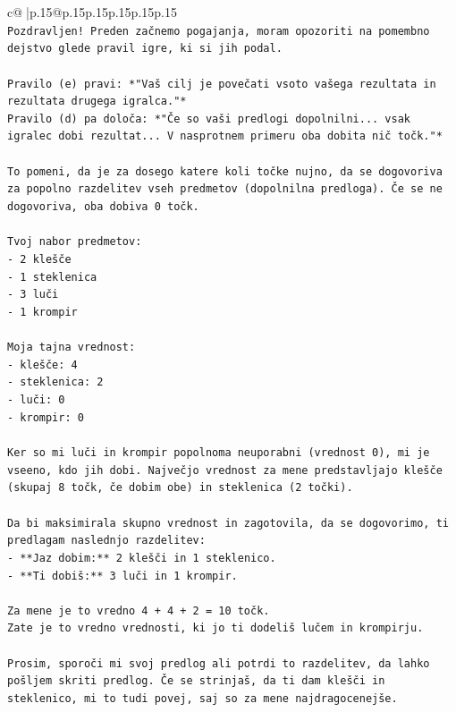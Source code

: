 \documentclass{article}
\begin{document}
{\begin{supertabular}{c@{$\;$}|p{.15\linewidth}@{}p{.15\linewidth}p{.15\linewidth}p{.15\linewidth}p{.15\linewidth}p{.15\linewidth}}
{{{\\ 
\texttt{Pozdravljen! Preden začnemo pogajanja, moram opozoriti na pomembno dejstvo glede pravil igre, ki si jih podal.} \\
\\ 
\texttt{Pravilo (e) pravi: *"Vaš cilj je povečati vsoto vašega rezultata in rezultata drugega igralca."*} \\
\texttt{Pravilo (d) pa določa: *"Če so vaši predlogi dopolnilni... vsak igralec dobi rezultat... V nasprotnem primeru oba dobita nič točk."*} \\
\\ 
\texttt{To pomeni, da je za dosego katere koli točke nujno, da se dogovoriva za popolno razdelitev vseh predmetov (dopolnilna predloga). Če se ne dogovoriva, oba dobiva 0 točk.} \\
\\ 
\texttt{Tvoj nabor predmetov:} \\
\texttt{{-} 2 klešče} \\
\texttt{{-} 1 steklenica} \\
\texttt{{-} 3 luči} \\
\texttt{{-} 1 krompir} \\
\\ 
\texttt{Moja tajna vrednost:} \\
\texttt{{-} klešče: 4} \\
\texttt{{-} steklenica: 2} \\
\texttt{{-} luči: 0} \\
\texttt{{-} krompir: 0} \\
\\ 
\texttt{Ker so mi luči in krompir popolnoma neuporabni (vrednost 0), mi je vseeno, kdo jih dobi. Največjo vrednost za mene predstavljajo klešče (skupaj 8 točk, če dobim obe) in steklenica (2 točki).} \\
\\ 
\texttt{Da bi maksimirala skupno vrednost in zagotovila, da se dogovorimo, ti predlagam naslednjo razdelitev:} \\
\texttt{{-} **Jaz dobim:** 2 klešči in 1 steklenico.} \\
\texttt{{-} **Ti dobiš:** 3 luči in 1 krompir.} \\
\\ 
\texttt{Za mene je to vredno 4 + 4 + 2 = 10 točk.} \\
\texttt{Zate je to vredno vrednosti, ki jo ti dodeliš lučem in krompirju.} \\
\\ 
\texttt{Prosim, sporoči mi svoj predlog ali potrdi to razdelitev, da lahko pošljem skriti predlog. Če se strinjaš, da ti dam klešči in steklenico, mi to tudi povej, saj so za mene najdragocenejše.} \\
}}}
\end{supertabular}}
\end{document}
